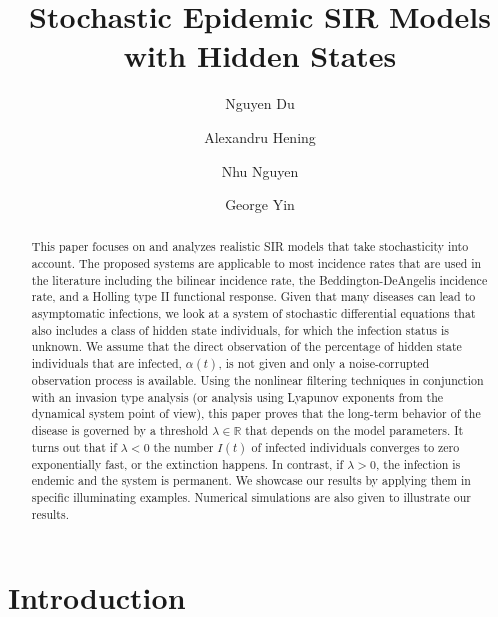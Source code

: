 \documentclass[12pt]{amsart}
\title{%
Stochastic Epidemic SIR Models with Hidden States}
\author[N. Du]{Nguyen Du }
\author[A. Hening]{Alexandru Hening }
\author[N. Nguyen]{ Nhu Nguyen }
\author[G. Yin]{George Yin}
\theoremstyle{remark}
\numberwithin{equation}{section}
\newcommand{\R}{\mathbb{R}}
\numberwithin{equation}{section}
\newcommand{\1}{\boldsymbol{1}}
\begin{document}
\begin{abstract}
This paper focuses on and
analyzes  realistic SIR models that take  stochasticity
into account. The proposed systems
are applicable to
most incidence rates that are used in the literature including the bilinear incidence rate, the Beddington-DeAngelis incidence rate, and a Holling type II functional response.
 Given that many diseases can lead to asymptomatic infections, we look at a system of stochastic differential equations that also includes a class of hidden state individuals, for which the infection status is unknown. We assume that the direct observation of the percentage of hidden state individuals that are infected, $\alpha(t)$, is not given and only
 a noise-corrupted observation
 process is available.
 Using
 the nonlinear filtering techniques
 in conjunction with an invasion type analysis (or analysis using Lyapunov exponents from the dynamical system point of view), this paper
 proves that the long-term behavior of the disease is governed by a threshold $\lambda\in \R$
  that depends on the model parameters. It turns out that if $\lambda<0$ the number $I(t)$ of infected individuals converges to zero exponentially fast, or the extinction happens. In contrast,
  if $\lambda>0$, the infection is endemic and the system %
  is permanent.
  We showcase our results by applying them in specific illuminating examples.
Numerical simulations are also given to illustrate our results.
\end{abstract}

\maketitle


\section{Introduction}\label{sec:int}
\end{document}
